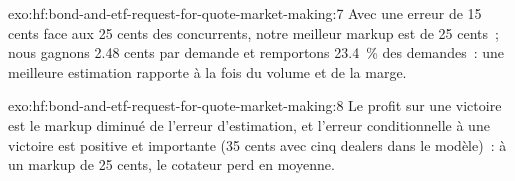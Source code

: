 \begin{solution}{exo:hf:bond-and-etf-request-for-quote-market-making:7}
Avec une erreur de 15 cents face aux 25 cents des concurrents, notre meilleur markup est de 25 cents~; nous gagnons 2.48 cents par demande et remportons 23.4~\% des demandes~: une meilleure
estimation rapporte à la fois du volume et de la marge.
\end{solution}

\begin{solution}{exo:hf:bond-and-etf-request-for-quote-market-making:8}
Le profit sur une victoire est le markup diminué de l'erreur d'estimation, et l'erreur conditionnelle à une victoire est positive et importante (35 cents avec cinq dealers dans le
modèle)~: à un markup de 25 cents, le cotateur perd en moyenne.
\end{solution}

